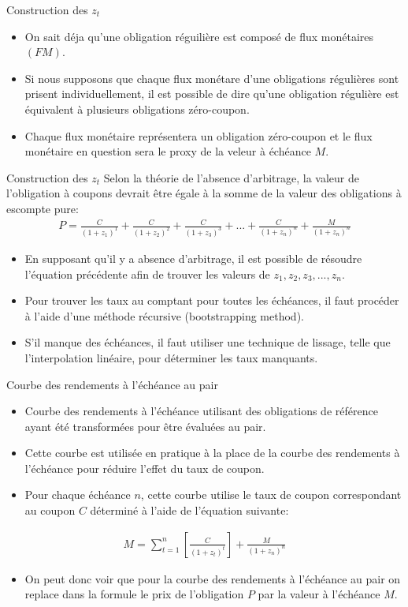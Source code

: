 \documentclass[11pt]{beamer}
\begin{document}
\begin{frame}{Construction des $z_t$}
\begin{itemize}
\item On sait déja qu'une obligation réguilière est composé de flux monétaires $(FM)$. 
\item Si nous supposons que chaque flux monétare d'une obligations régulières sont prisent individuellement,  il est possible de dire qu'une obligation régulière est équivalent à plusieurs obligations zéro-coupon. 
\item Chaque flux monétaire représentera un obligation zéro-coupon et le flux monétaire en question sera le proxy de la veleur à échéance $M$.
\end{itemize}
\end{frame}

\begin{frame}{Construction des $z_t$}
Selon la théorie de l’absence d’arbitrage, la valeur de l’obligation à coupons devrait être égale à la somme de la valeur des obligations à escompte pure:
\begin{align*}
P=\frac{C}{(1+z_1)^1}+\frac{C}{(1+z_2)^2}+\frac{C}{(1+z_3)^3}+...+\frac{C}{(1+z_n)^n}+\frac{M}{(1+z_n)^{n}}
\end{align*}
\begin{itemize}
\item En supposant qu’il y a absence d’arbitrage,  il est possible de résoudre l’équation précédente afin de trouver les valeurs de $z_1, z_2, z_3,...,z_n$.  
\item Pour trouver les taux au comptant pour toutes les échéances,  il faut procéder à l’aide d’une méthode récursive (bootstrapping method). 
\item S’il manque des échéances, il faut utiliser une technique de lissage, telle que l’interpolation linéaire, pour déterminer les taux manquants.
\end{itemize}
\end{frame}
\begin{frame}{Courbe des rendements à l’échéance au pair}
\begin{itemize}
\item Courbe des rendements à l’échéance utilisant des obligations de référence ayant été transformées pour être évaluées au pair.  
\item Cette courbe est utilisée en pratique à la place de la courbe des rendements à l’échéance pour réduire l’effet du taux de coupon.
\item Pour chaque échéance $n$,  cette courbe utilise le taux de coupon correspondant au coupon $C$ déterminé à l’aide de l’équation suivante:
\end{itemize}
\begin{align*}
M=\sum_{t=1}^n \left[ \frac{C}{(1+z_t)^t} \right]+\frac{M}{(1+z_n)^{n}}
\end{align*}
\begin{itemize}
\item On peut donc voir que pour la courbe des rendements à l’échéance au pair on replace dans la formule le prix de l'obligation $P$ par la valeur à l'échéance $M$.
\end{itemize}
\end{frame}
\end{document}
